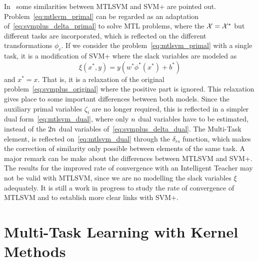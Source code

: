 In~\cite{LiangC08} some similarities between MTLSVM and SVM+ are pointed out. Problem~\eqref{eq:mtlsvm_primal} can be regarded as an adaptation of~\eqref{eq:svmplus_delta_primal} to solve MTL problems, where the $\mathcal{X} = \mathcal{X}^*$ but different tasks are incorporated, which is reflected on the different transformations $\phi_r$.
If we consider the problem~\eqref{eq:mtlsvm_primal} with a single task, it is a modification of SVM+ where the slack variables are modeled as
$$ \xi(x^*, y) = y (w^* \phi^*(x^*) + b^*)  $$
and $x^* = x$. That is, it is a relaxation of the original problem~\eqref{eq:svmplus_original} where the positive part is ignored.
This relaxation gives place to some important differences between both models. Since the auxiliary primal variables $\zeta_i$ are no longer required, this is reflected in a simpler dual form~\eqref{eq:mtlsvm_dual}, where only $n$ dual variables have to be estimated, instead of the $2n$ dual variables of~\eqref{eq:svmplus_delta_dual}.
The Multi-Task element, is reflected on~\eqref{eq:mtlsvm_dual} through the $\delta_{rs}$ function, which makes the correction of similarity only possible between elements of the same task.
%
A major remark can be make about the differences between MTLSVM and SVM+. The results for the improved rate of convergence with an Intelligent Teacher may not be valid with MTLSVM, since we are no modelling the slack variables $\xi$ adequately. 
It is still a work in progress to study the rate of convergence of MTLSVM and to establish more clear links with SVM+.



\section{Multi-Task Learning with Kernel Methods} %

